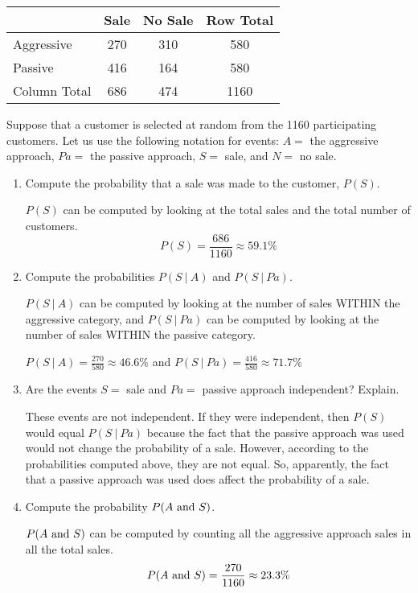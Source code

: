 \documentclass{article}
\newcommand{\answer}[1]{\color{white}#1}
\begin{document}
\begin{enumerate}
\begin{center}
\begin{tabular}{l|cc|c}
& Sale \hfill & No Sale \hfill & Row Total \\
\hline
Aggressive & 270 & 310 & 580 \\
Passive & 416 & 164 & 580 \\
\hline
Column Total & 686 & 474 & 1160 \\
\end{tabular} 
\end{center}

Suppose that a customer is selected at random from the 1160 participating customers.  Let us use the following notation for events: $A = $ the aggressive approach, $Pa = $ the passive approach, $S = $ sale, and $N = $ no sale.
	\begin{enumerate}
	\item Compute the probability that a sale was made to the customer, $P(S)$. 
	
	{\answer $P(S)$ can be computed by looking at the total sales and the total number of customers. 
	$$P(S) = \frac{686}{1160} \approx 59.1\%$$} 
	
	\item Compute the probabilities $P(S\ |\ A)$ and $P(S\ |\ Pa)$. 
	
	{\answer $P(S\ |\ A)$ can be computed by looking at the number of sales WITHIN the aggressive category, and $P(S\ |\ Pa)$ can be computed by looking at the number of sales WITHIN the passive category. 
	
	$P(S\ |\ A) = \frac{270}{580} \approx 46.6\%$ and $P(S\ |\ Pa) = \frac{416}{580} \approx 71.7\%$} 
	
	\item Are the events $S = $ sale and $Pa = $ passive approach independent?  Explain. 
	
	{\answer These events are not independent.  If they were independent, then $P(S)$ would equal $P(S\ |\ Pa)$ because the fact that the passive approach was used would not change the probability of a sale.  However, according to the probabilities computed above, they are not equal.  So, apparently, the fact that a passive approach was used does affect the probability of a sale.} 
	
	\item Compute the probability $P(A \textnormal{ and } S)$. 
	
	{\answer  $P(A \textnormal{ and } S)$ can be computed by counting all the aggressive approach sales in all the total sales. 
	$$P(A \textnormal{ and } S) = \frac{270}{1160}  \approx 23.3\%$$} 
	

\end{enumerate}
\end{enumerate}
\end{document}
